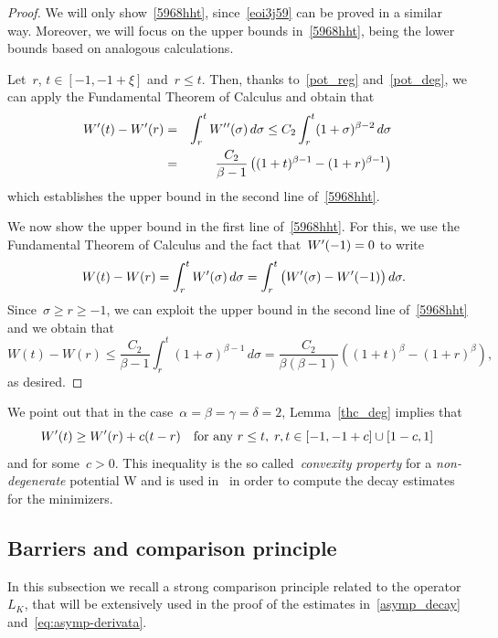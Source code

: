 \documentclass[10pt,a4paper]{amsart}
\numberwithin{equation}{section}
\begin{document}
\begin{proof} 
We will only show~\eqref{5968hht}, since~\eqref{eoi3j59} can be
proved in a similar way. Moreover, we will focus on the upper bounds
in~\eqref{5968hht}, being the lower bounds based on analogous calculations.

Let~$r$, $t \in [-1,-1+\xi]$ and~$r\leq t$. Then, thanks to~\eqref{pot_reg}
and~\eqref{pot_deg}, we can apply the Fundamental Theorem of Calculus and obtain that
\begin{eqnarray*}
W\rq{}(t) - W\rq{}(r) & = & \int_{r}^t W\rq{}\rq{}(\sigma) \, d\sigma \leq C_2 \int_{r}^t (1+\sigma)^{\beta-2} \, d\sigma \\
& = & \frac{C_2}{\beta-1} \left((1+t)^{\beta-1} - (1+r)^{\beta-1}\right) \end{eqnarray*}
which establishes the upper bound in the second line of~\eqref{5968hht}.

We now show the upper bound in the first line of~\eqref{5968hht}.
For this, we use the Fundamental Theorem of Calculus 
and the fact that~$W\rq{}(-1)=0$ to write
\begin{eqnarray*}&& W(t)-W(r)=\int_r^t W\rq{}(\sigma) \, d\sigma
=\int_r^t \big(W\rq{}(\sigma)- W\rq{}(-1)\big)\, d\sigma.
\end{eqnarray*}
Since~$\sigma\ge r\ge-1$, we can exploit the upper bound
in the second line of~\eqref{5968hht} and we obtain that
$$W(t)-W(r)\le \frac{C_2}{\beta-1}
\int_r^t  (1+\sigma)^{\beta-1} \, d\sigma
=  \frac{C_2}{\beta(\beta-1)} \left( (1+t)^{\beta} - (1+r)^{\beta}\right),
$$
as desired.
\end{proof}

We point out that
in the case~$\alpha=\beta=\gamma=\delta=2$, Lemma~\ref{thc_deg} implies that
\begin{equation*}%
   W\rq{}(t) \geq W\rq{}(r)+c(t-r) \quad\mbox{for any } r\leq t , \; r,t \in [-1,-1+c]\cup[1-c,1]
\end{equation*}
 and for some~$c >0$. This inequality is the so called~\textit{convexity property} for a \textit{non-degenerate} potential W and is used in~\cite{PSV13, CP16} in order to compute the decay estimates for the minimizers.   

    \subsection{Barriers and comparison principle}\label{bars}
 In this subsection we recall a strong comparison principle related to the operator~${L}_K$, that will be extensively used in the proof of
 the estimates in~\eqref{asymp_decay} and~\eqref{eq:asymp-derivata}.
\end{document}
